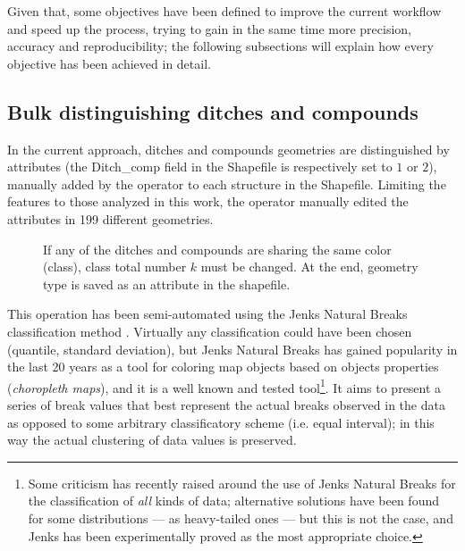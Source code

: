         Given that, some objectives have been defined to improve the current workflow and speed up the process, trying to gain in the same time more precision, accuracy and reproducibility; the following subsections will explain how every objective has been achieved in detail.

        \subsection{Bulk distinguishing ditches and compounds}
            In the current approach, ditches and compounds geometries are distinguished by attributes (the \textsf{Ditch\_comp} field in the Shapefile is respectively set to $1$ or $2$), manually added by the operator to each structure in the Shapefile. Limiting the features to those analyzed in this work, the operator manually edited the attributes in 199 different geometries.

            \begin{wrapfigure}{l}{0.5\textwidth}
                \centering
                \vspace{-0.05\textheight}
                \begin{tikzpicture}[x=1mm,y=1mm,scale=0.005]
                    
                \end{tikzpicture}
                \caption[Flow chart: the logic of bulk distinguishing ditches and compounds]{If any of the ditches and compounds are sharing the same color (class), class total number $k$ must be changed. At the end, geometry type is saved as an attribute in the shapefile.}
                \label{fig:flow-map}
                \vspace{-0.03\textheight}
            \end{wrapfigure}

            This operation has been semi-automated using the Jenks Natural Breaks classification method \cite{jenks1977}. Virtually any classification could have been chosen (quantile, standard deviation), but Jenks Natural Breaks has gained popularity in the last 20 years as a tool for coloring map objects based on objects properties (\emph{choropleth maps}), and it is a well known and tested tool\footnote{Some criticism has recently raised around the use of Jenks Natural Breaks for the classification of \emph{all} kinds of data; alternative solutions have been found for some distributions --- as heavy-tailed ones \cite{jenks-tail} --- but this is not the case, and Jenks has been experimentally proved as the most appropriate choice.}. It aims to present a series of break values that best represent the actual breaks observed in the data as opposed to some arbitrary classificatory scheme (i.e. equal interval); in this way the actual clustering of data values is preserved.

